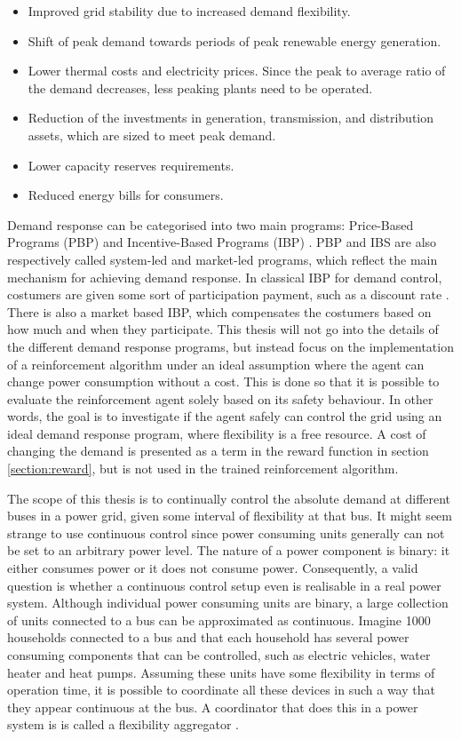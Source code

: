 \documentclass[class=book, crop=false, 11pt]{standalone}
\begin{document}
\begin{itemize}
\item Improved grid stability due to increased demand flexibility. 
\item Shift of peak demand towards periods of peak renewable energy
generation.
\item Lower thermal costs and electricity prices. Since the peak to average
ratio of the demand decreases, less peaking plants need to be operated. 
\item Reduction of the investments in generation, transmission, and distribution assets, which are sized to meet peak demand.
\item Lower capacity reserves requirements.
\item Reduced energy bills for consumers. 
\end{itemize}


Demand response can be categorised into two main programs: Price-Based Programs (PBP) and Incentive-Based Programs (IBP) \cite{demand_response_definition}. PBP and IBS are also respectively called system-led and market-led programs, which reflect the main mechanism for achieving demand response. In classical IBP for demand control, costumers are given some sort of participation payment, such as a discount rate \cite{demand_response_definition}. There is also a market based IBP, which compensates the costumers based on how much and when they participate. This thesis will not go into the details of the different demand response programs, but instead focus on the implementation of a reinforcement algorithm under an ideal assumption where the agent can change power consumption without a cost. This is done so that it is possible to evaluate the reinforcement agent solely based on its safety behaviour. In other words, the goal is to investigate if the agent safely can control the grid using an ideal demand response program, where flexibility is a free resource. A cost of changing the demand is presented as a term in the reward function in section \ref{section:reward}, but is not used in the trained reinforcement algorithm.    

The scope of this thesis is to continually control the absolute demand at different buses in a power grid, given some interval of flexibility at that bus. It might seem strange to use continuous control since power consuming units generally can not be set to an arbitrary power level. The nature of a power component is binary: it either consumes power or it does not consume power. Consequently, a valid question is whether a continuous control setup even is realisable in a real power system. Although individual power consuming units are binary, a large collection of units connected to a bus can be approximated as continuous. Imagine 1000 households connected to a bus and that each household has several power consuming components that can be controlled, such as electric vehicles, water heater and heat pumps. Assuming these units have some flexibility in terms of operation time, it is possible to coordinate all these devices in such a way that they appear continuous at the bus. A coordinator that does this in a power system is is called a flexibility aggregator \cite{koliou2014_aggregator}.
\end{document}
